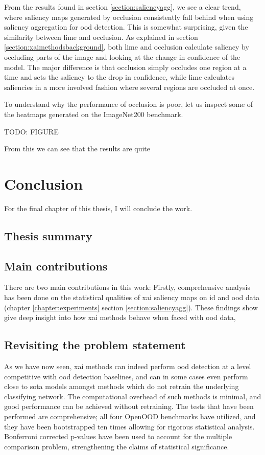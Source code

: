 \documentclass[UKenglish]{uiomasterthesis} %
\theoremstyle{definition}
\begin{document}
From the results found in section \ref{section:saliencyagg}, we see a clear trend, where saliency maps generated by occlusion consistently fall behind when using saliency aggregation for \ac{ood} detection. This is somewhat surprising, given the similarity between \ac{lime} and occlusion. As explained in section \ref{section:xaimethodsbackground}, both \ac{lime} and occlusion calculate saliency by occluding parts of the image and looking at the change in confidence of the model. The major difference is that occlusion simply occludes one region at a time and sets the saliency to the drop in confidence, while \ac{lime} calculates saliencies in a more involved fashion where several regions are occluded at once.

To understand why the performance of occlusion is poor, let us inspect some of the heatmaps generated on the ImageNet200 benchmark.

TODO: FIGURE

From this we can see that the results are quite




\chapter{Conclusion} \label{chapter:conclusion}

For the final chapter of this thesis, I will conclude the work.

\section{Thesis summary}

\section{Main contributions}

There are two main contributions in this work: Firstly, comprehensive analysis has been done on the statistical qualities of \ac{xai} saliency maps on \ac{id} and \ac{ood} data (chapter \ref{chapter:experiments} section \ref{section:saliencyagg}). These findings show give deep insight into how \ac{xai} methods behave when faced with \ac{ood} data,

\section{Revisiting the problem statement}

As we have now seen, \ac{xai} methods can indeed perform \ac{ood} detection at a level competitive with \ac{ood} detection baselines, and can in some cases even perform close to \ac{sota} models amongst methods which do not retrain the underlying classifying network. The computational overhead of such methods is minimal, and good performance can be achieved without retraining. The tests that have been performed are comprehensive; all four OpenOOD benchmarks have utilized, and they have been bootstrapped ten times allowing for rigorous statistical analysis. Bonferroni corrected p-values have been used to account for the multiple comparison problem, strengthening the claims of statistical significance.
\end{document}
